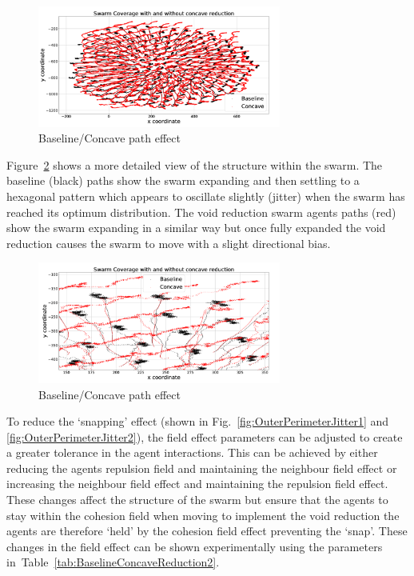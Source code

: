 \documentclass[preprint,12pt]{elsarticle}
\begin{document}
\begin{figure}
\begin{center}
\includegraphics[width=8cm]{figures/BaselineConcaveEffectPath1}
\end{center}
\caption{Baseline/Concave path effect\label{concave:BaselineConcaveEffectPath1}}
\end{figure}

Figure~\ref{concave:BaselineConcaveEffectPath2} shows a more detailed view of the structure within the swarm. The baseline (black) paths show the swarm expanding and then settling to a hexagonal pattern which appears to oscillate slightly (jitter) when the swarm has reached its optimum distribution. The void reduction swarm agents paths (red) show the swarm expanding in a similar way but once fully expanded the void reduction causes the swarm to move with a slight directional bias.
\begin{figure}
\begin{center}
\includegraphics[width=8cm]{figures/BaselineConcaveEffectPath2}
\end{center}
\caption{Baseline/Concave path effect\label{concave:BaselineConcaveEffectPath2}}
\end{figure}

To reduce the `snapping' effect (shown in Fig.~\ref{fig:OuterPerimeterJitter1} and \ref{fig:OuterPerimeterJitter2}), the field effect parameters can be adjusted to create a greater tolerance in the agent interactions. This can be achieved by either reducing the agents repulsion field and maintaining the neighbour field effect or increasing the neighbour field effect and maintaining the repulsion field effect. These changes affect the structure of the swarm but ensure that the agents to stay within the cohesion field when moving to implement the void reduction the agents are therefore `held' by the cohesion field effect preventing the `snap'. These changes in the field effect can be shown experimentally using the parameters in~Table~\ref{tab:BaselineConcaveReduction2}. 
\end{document}
